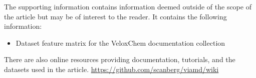 \documentclass[journal=jacsat,manuscript=article]{achemso}
\begin{document}
\begin{suppinfo}
The supporting information contains information deemed outside of the scope of the article but may be of interest to the reader. It contains the following information:
\begin{itemize}
\item Dataset feature matrix for the VeloxChem documentation collection
\end{itemize}

There are also online resources providing documentation, tutorials, and the datasets used in the article. \href{https://github.com/scanberg/viamd/wiki}{https://github.com/scanberg/viamd/wiki}

\end{suppinfo}


\end{document}
